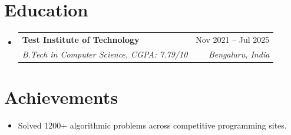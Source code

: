 \documentclass[letterpaper,10pt]{article}
\makeatletter
\newcommand{\resumeItem}[1]{
    \item\small{#1 \vspace{-2pt}}
}
\newcommand{\resumeSubheading}[4]{
    \vspace{-2pt}\item
    \begin{tabular*}{0.97\textwidth}[t]{l@{\extracolsep{\fill}}r}
        \textbf{#1} & #2 \\
        \textit{\small #3} & \textit{\small #4} \\
    \end{tabular*}\vspace{-7pt}
}
\makeatother
\begin{document}
\section{Education}
\begin{itemize}[label={},leftmargin=0pt]
  \resumeSubheading
    {Test Institute of Technology}{Nov 2021 -- Jul 2025}
    {B.Tech in Computer Science, CGPA: 7.79/10}{Bengaluru, India}
\end{itemize}

\section{Achievements}
\begin{itemize}[leftmargin=14pt]
    \resumeItem{Solved 1200+ algorithmic problems across competitive programming sites.}
\end{itemize}
\end{document}

